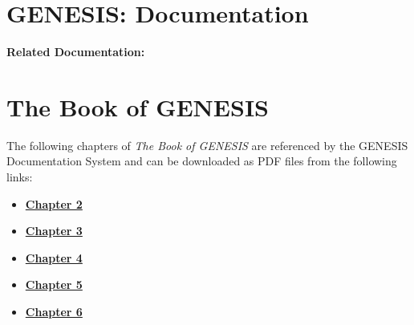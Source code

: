 \documentclass[12pt]{article}
\begin{document}
\section*{GENESIS: Documentation}

{\bf Related Documentation:}

\section*{The Book of GENESIS}

The following chapters of {\it The Book of GENESIS} are referenced by the GENESIS Documentation System and can be downloaded as PDF files from the following links:

\begin{itemize}
\item \href{../bog-ch2/bog-ch2.tex}{\bf Chapter 2}
\item \href{../bog-ch3/bog-ch3.tex}{\bf Chapter 3}
\item \href{../bog-ch4/bog-ch4.tex}{\bf Chapter 4}
\item \href{../bog-ch5/bog-ch5.tex}{\bf Chapter 5}
\item \href{../bog-ch6/bog-ch6.tex}{\bf Chapter 6}
\end{itemize}
\end{document}
